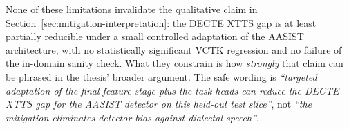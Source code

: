 None of these limitations invalidate the qualitative claim in
Section~\ref{sec:mitigation-interpretation}: the DECTE XTTS gap is at least partially
reducible under a small controlled adaptation of the AASIST
architecture, with no statistically significant VCTK regression
and no failure of the in-domain sanity check. What they
constrain is how \emph{strongly} that claim can be phrased in the
thesis' broader argument. The safe wording is \emph{``targeted
adaptation of the final feature stage plus the task heads can
reduce the DECTE XTTS gap for the AASIST detector on this
held-out test slice''}, not \emph{``the mitigation eliminates
detector bias against dialectal speech''}.
